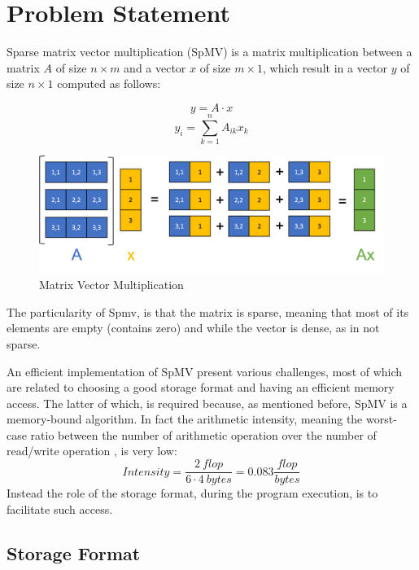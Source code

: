 \documentclass[conference]{IEEEtran}
\newcommand{\torem}[1]{\color{olive} #1 \color{black}}
\begin{document}
\section{Problem Statement}
Sparse matrix vector multiplication (SpMV) is a matrix multiplication between a matrix $A$ of size $n\times m$ and a vector $x$ of size $m\times 1$, which result in a vector $y$ of size $n\times 1$ computed as follows:

\[y=A \cdot x\]
\[y_i = \sum_{k=1}^{n}A_{ik} x_{k}\]

\begin{figure}[h!]
	\centering
	\includegraphics[width=0.9\linewidth]{other_img/matrix_vec_mult}
	\caption{Matrix Vector Multiplication}
	\label{fig:matrixvecmult}
\end{figure}

The particularity of Spmv, is that the matrix is sparse, meaning that most of its elements are empty (contains zero) and while the vector is dense, as in not sparse.



An efficient implementation of SpMV present various challenges, most of which are related to choosing a good storage format and having an efficient memory access. The latter of which, is required because, as mentioned before, SpMV is a memory-bound algorithm. In fact the arithmetic intensity, meaning the worst-case ratio between the number of arithmetic operation over the number of read/write operation , is very low:
\[Intensity = \frac{2\ flop}{6 \cdot 4\ bytes} = 0.083\frac {flop}{bytes}\]
Instead the role of the storage format, during the program execution, is to facilitate such access.

\subsection{Storage Format}
\end{document}
